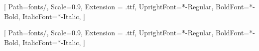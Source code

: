 \setsansfont{FiraSans}[
    Path=fonts/,
    Scale=0.9,
    Extension = .ttf,
    UprightFont=*-Regular,
    BoldFont=*-Bold,
    ItalicFont=*-Italic,
    ]

\setmainfont{FiraSans}[
    Path=fonts/,
    Scale=0.9,
    Extension = .ttf,
    UprightFont=*-Regular,
    BoldFont=*-Bold,
    ItalicFont=*-Italic,
    ]
    
    
\usepackage{quotchap} 
	
\usepackage{xcolor}
\renewcommand*{\chapnumfont}{%
  \sectfont\fontsize{120}{150}\selectfont%
  \color{chaptergrey}%
  }

\usepackage[role = mydarkgreen, grid = lightgrey, skipempty]{./LaTeX_pkgs/credits}




